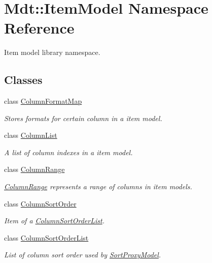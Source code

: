 \hypertarget{namespace_mdt_1_1_item_model}{}\section{Mdt\+:\+:Item\+Model Namespace Reference}
\label{namespace_mdt_1_1_item_model}


Item model library namespace.  


\subsection*{Classes}
\begin{DoxyCompactItemize}
\item 
class \hyperlink{class_mdt_1_1_item_model_1_1_column_format_map}{Column\+Format\+Map}
\begin{DoxyCompactList}\small\item\em Stores formats for certain column in a item model. \end{DoxyCompactList}\item 
class \hyperlink{class_mdt_1_1_item_model_1_1_column_list}{Column\+List}
\begin{DoxyCompactList}\small\item\em A list of column indexes in a item model. \end{DoxyCompactList}\item 
class \hyperlink{class_mdt_1_1_item_model_1_1_column_range}{Column\+Range}
\begin{DoxyCompactList}\small\item\em \hyperlink{class_mdt_1_1_item_model_1_1_column_range}{Column\+Range} represents a range of columns in item models. \end{DoxyCompactList}\item 
class \hyperlink{class_mdt_1_1_item_model_1_1_column_sort_order}{Column\+Sort\+Order}
\begin{DoxyCompactList}\small\item\em Item of a \hyperlink{class_mdt_1_1_item_model_1_1_column_sort_order_list}{Column\+Sort\+Order\+List}. \end{DoxyCompactList}\item 
class \hyperlink{class_mdt_1_1_item_model_1_1_column_sort_order_list}{Column\+Sort\+Order\+List}
\begin{DoxyCompactList}\small\item\em List of column sort order used by \hyperlink{class_mdt_1_1_item_model_1_1_sort_proxy_model}{Sort\+Proxy\+Model}. \end{DoxyCompactList}\item 

\end{DoxyCompactItemize}
